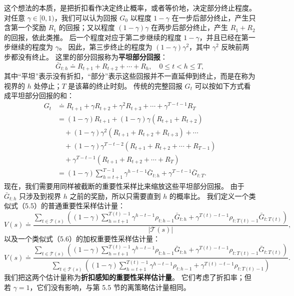 \documentclass[UTF8,12pt,a4paper,fontset=fandol]{ctexart}
\begin{document}
这个想法的本质，是把折扣看作决定终止概率，或者等价地，决定部分终止程度。
对任意 $\gamma\in[0,1)$，我们可以认为回报 $G_0$ 以程度 $1-\gamma$ 在一步后部分终止，产生只含第一个奖励 $R_1$ 的回报；又以程度 $(1-\gamma)\gamma$ 在两步后部分终止，产生 $R_1+R_2$ 的回报，依此类推。
后一个程度对应于第二步继续的程度 $1-\gamma$，并且已经在第一步继续的程度为 $\gamma$。
因此，第三步终止的程度为 $(1-\gamma)\gamma^2$，其中 $\gamma^2$ 反映前两步都没有终止。
这里的部分回报称为\textbf{平坦部分回报}：
\[
\bar G_{t:h}\doteq R_{t+1}+R_{t+2}+\cdots+R_h,
\quad 0\le t<h\le T,
\]
其中“平坦”表示没有折扣，“部分”表示这些回报并不一直延伸到终止，而是在称为视界的 $h$ 处停止；$T$ 是该幕的终止时刻。
传统的完整回报 $G_t$ 可以按如下方式看成平坦部分回报的和：
\[
\begin{aligned}
G_t &\doteq R_{t+1}+\gamma R_{t+2}+\gamma^2R_{t+3}+\cdots+\gamma^{T-t-1}R_T\\
&= (1-\gamma)R_{t+1}
 +(1-\gamma)\gamma(R_{t+1}+R_{t+2})\\
&\quad +(1-\gamma)\gamma^2(R_{t+1}+R_{t+2}+R_{t+3})+\cdots\\
&\quad +(1-\gamma)\gamma^{T-t-2}(R_{t+1}+R_{t+2}+\cdots+R_{T-1})\\
&\quad +\gamma^{T-t-1}(R_{t+1}+R_{t+2}+\cdots+R_T)\\
&=(1-\gamma)\sum_{h=t+1}^{T-1}\gamma^{h-t-1}\bar G_{t:h}
 +\gamma^{T-t-1}\bar G_{t:T}.
\end{aligned}
\]
现在，我们需要用同样被截断的重要性采样比来缩放这些平坦部分回报。
由于 $\bar G_{t:h}$ 只涉及到视界 $h$ 之前的奖励，所以只需要直到 $h$ 的概率比。
我们定义一个类似式（5.5）的普通重要性采样估计量：
\begin{equation}
V(s)\doteq
\frac{
\sum_{t\in\mathcal{T}(s)}
\left((1-\gamma)\sum_{h=t+1}^{T(t)-1}\gamma^{h-t-1}\rho_{t:h-1}\bar G_{t:h}
+\gamma^{T(t)-t-1}\rho_{t:T(t)-1}\bar G_{t:T(t)}\right)}
{|\mathcal{T}(s)|},
\end{equation}
以及一个类似式（5.6）的加权重要性采样估计量：
\begin{equation}
V(s)\doteq
\frac{
\sum_{t\in\mathcal{T}(s)}
\left((1-\gamma)\sum_{h=t+1}^{T(t)-1}\gamma^{h-t-1}\rho_{t:h-1}\bar G_{t:h}
+\gamma^{T(t)-t-1}\rho_{t:T(t)-1}\bar G_{t:T(t)}\right)}
{\sum_{t\in\mathcal{T}(s)}
\left((1-\gamma)\sum_{h=t+1}^{T(t)-1}\gamma^{h-t-1}\rho_{t:h-1}
+\gamma^{T(t)-t-1}\rho_{t:T(t)-1}\right)}.
\end{equation}
我们把这两个估计量称为\textbf{折扣感知的重要性采样估计量}。
它们考虑了折扣率；但若 $\gamma=1$，它们没有影响，与第 5.5 节的离策略估计量相同。
\end{document}
